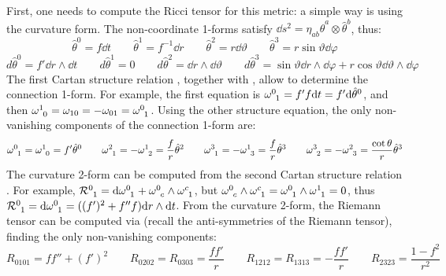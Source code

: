 First, one needs to compute the Ricci tensor for this metric: a simple way is using the curvature form. The non-coordinate 1-forms satisfy $ \dd s^2 = \eta_{ab} \hat{\theta}^a \otimes \hat{\theta}^b $, thus:
\begin{equation*}
  \hat{\theta}^0 = f \dd t
  \qquad
  \hat{\theta}^1 = f^{-1} \dd r
  \qquad
  \hat{\theta}^2 = r \dd \vartheta
  \qquad
  \hat{\theta}^3 = r \sin \vartheta \dd \varphi
\end{equation*}
\begin{equation*}
  d\hat{\theta}^0 = f' \dd r \wedge \dd t
  \qquad
  d\hat{\theta}^1 = 0
  \qquad
  d\hat{\theta}^2 = \dd r \wedge \dd \vartheta
  \qquad
  d\hat{\theta}^3 = \sin \vartheta \dd r \wedge \dd \varphi + r \cos \vartheta \dd \vartheta \wedge \dd \varphi
\end{equation*}
The first Cartan structure relation , together with , allow to determine the connection 1-form. For example, the first equation is $ \tensor{\omega}{^0_1} = f' f \dd t = f' \dd \hat{\theta}^0 $, and then $ \tensor{\omega}{^1_0} = \omega_{10} = - \omega_{01} = \tensor{\omega}{^0_1} $. Using the other structure equation, the only non-vanishing components of the connection 1-form are:
\begin{equation*}
  \tensor{\omega}{^0_1} = \tensor{\omega}{^1_0} = f' \hat{\theta}^0
  \qquad
  \tensor{\omega}{^2_1} = - \tensor{\omega}{^1_2} = \frac{f}{r} \hat{\theta}^2
  \qquad
  \tensor{\omega}{^3_1} = - \tensor{\omega}{^1_3} = \frac{f}{r} \hat{\theta}^3
  \qquad
  \tensor{\omega}{^3_2} = - \tensor{\omega}{^2_3} = \frac{\cot \theta}{r} \hat{\theta}^3
\end{equation*}
The curvature 2-form can be computed from the second Cartan structure relation . For example, $ \tensor{\mathcal{R}}{^0_1} = \dd \tensor{\omega}{^0_1} + \tensor{\omega}{^0_c} \wedge \tensor{\omega}{^c_1} $, but $ \tensor{\omega}{^0_c} \wedge \tensor{\omega}{^c_1} = \tensor{\omega}{^0_1} \wedge \tensor{\omega}{^1_1} = 0 $, thus $ \tensor{\mathcal{R}}{^0_1} = \dd \tensor{\omega}{^0_1} = ( (f')^2 + f'' f) \dd r \wedge \dd t $. From the curvature 2-form, the Riemann tensor can be computed via  (recall the anti-symmetries of the Riemann tensor), finding the only non-vanishing components:
\begin{equation*}
  R_{0101} = f f'' + (f')^2
  \qquad
  R_{0202} = R_{0303} = \frac{f f'}{r}
  \qquad
  R_{1212} = R_{1313} = - \frac{f f'}{r}
  \qquad
  R_{2323} = \frac{1 - f^2}{r^2}
\end{equation*}
